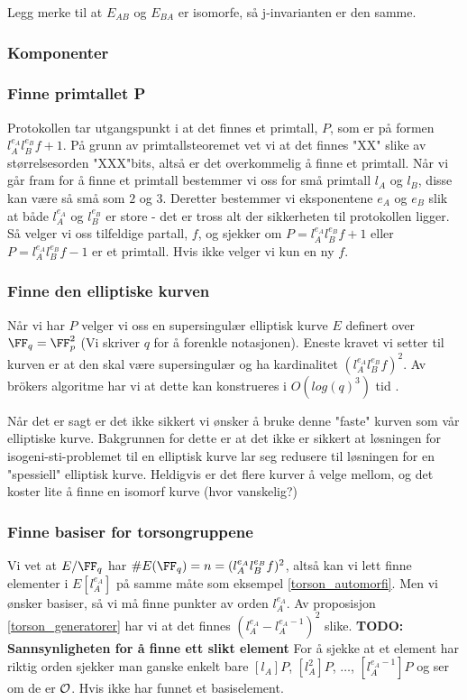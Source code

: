 Legg merke til at $E_{AB}$ og $E_{BA}$ er isomorfe, så j-invarianten er den samme.
\subsubsection{Komponenter}
\subsubsection*{Finne primtallet P}
Protokollen tar utgangspunkt i at det finnes et primtall, $P$, som er på formen $l_A^{e_A}l_B^{e_B}f + 1$. På grunn av primtallsteoremet vet vi at det finnes "XX" slike av størrelsesorden "XXX"bits, altså er det overkommelig å finne et primtall. Når vi går fram for å finne et primtall bestemmer vi oss for små primtall $l_A$ og $l_B$, disse kan være så små som $2$ og $3$. Deretter bestemmer vi eksponentene $e_A$ og $e_B$ slik at både $l_A^{e_A}$ og $l_B^{e_B}$ er store - det er tross alt der sikkerheten til protokollen ligger. Så velger vi oss tilfeldige partall, $f$, og sjekker om $P = l_A^{e_A}l_B^{e_B}f + 1$ eller $P = l_A^{e_A}l_B^{e_B}f - 1$ er et primtall. Hvis ikke velger vi kun en ny $f$.
\subsubsection*{Finne den elliptiske kurven}
Når vi har $P$ velger vi oss en supersingulær elliptisk kurve $E$ definert over $\FF_q = \FF_p^2$ (Vi skriver $q$ for å forenkle notasjonen). Eneste kravet vi setter til kurven er at den skal være supersingulær og ha kardinalitet $(l_A^{e_A}l_B^{e_B}f)^2$. Av brökers algoritme har vi at dette kan konstrueres i $O(log(q)^3)$ tid \cite{cunstructing_supersingular_elliptic_curves}.

Når det er sagt er det ikke sikkert vi ønsker å bruke denne "faste" kurven som vår elliptiske kurve. Bakgrunnen for dette er at det ikke er sikkert at løsningen for isogeni-sti-problemet til en elliptisk kurve lar seg redusere til løsningen for en "spessiell" elliptisk kurve. Heldigvis er det flere kurver å velge mellom, og det koster lite å finne en isomorf kurve (hvor vanskelig?)

\subsubsection*{Finne basiser for torsongruppene}
Vi vet at $E/\FF_q$ har $\#E(\FF_q) = n = (l_A^{e_A}l_B^{e_B}f)^2$, altså kan vi lett finne elementer i $E[l_A^{e_A}]$ på samme måte som eksempel \ref{torson_automorfi}. Men vi ønsker basiser, så vi må finne punkter av orden $l_A^{e_A}$. Av proposisjon \ref{torson_generatorer} har vi at det finnes $(l_A^{e_A} - l_A^{e_A - 1})^2$ slike. \textbf{TODO: Sannsynligheten for å finne ett slikt element}
For å sjekke at et element har riktig orden sjekker man ganske enkelt bare $[l_A]P$, $[l_A^2]P$, $\ldots$, $[l_A^{e_A-1}]P$ og ser om de er $\mathcal{O}$. Hvis ikke har funnet et basiselement.

